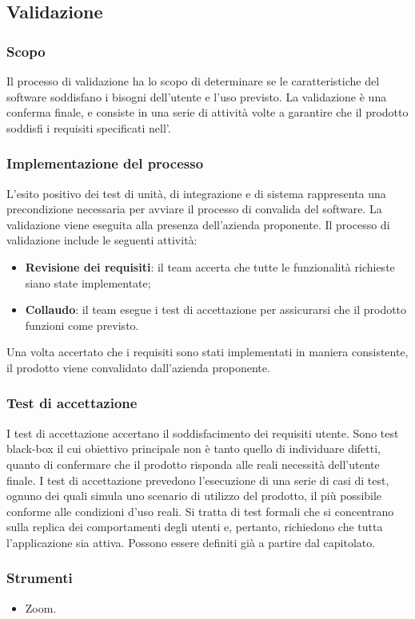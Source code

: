 \subsection{Validazione}\label{validazione}

\subsubsection{Scopo}
\par Il processo di validazione ha lo scopo di determinare se le caratteristiche del software soddisfano i bisogni dell'utente e l’uso previsto. La validazione è una conferma finale, e consiste in una serie di attività volte a garantire che il prodotto soddisfi i requisiti specificati nell’\AnalisiDeiRequisiti.

\subsubsection{Implementazione del processo}
\par L’esito positivo dei test di unità, di integrazione e di sistema rappresenta una precondizione necessaria per avviare il processo di convalida del software. La validazione viene eseguita alla presenza dell'azienda proponente. Il processo di validazione include le seguenti attività:
\begin{itemize}
  \item \textbf{Revisione dei requisiti}: il team accerta che tutte le funzionalità richieste siano state implementate;
  \item \textbf{Collaudo}: il team esegue i test di accettazione per assicurarsi che il prodotto funzioni come previsto.
\end{itemize}

\vspace{0.5\baselineskip}
\par Una volta accertato che i requisiti sono stati implementati in maniera consistente, il prodotto viene convalidato dall’azienda proponente.

\subsubsection{Test di accettazione}
\par I test di accettazione accertano il soddisfacimento dei requisiti utente. Sono test black-box il cui obiettivo principale non è tanto quello di individuare difetti, quanto di confermare che il prodotto risponda alle reali necessità dell’utente finale. I test di accettazione prevedono l’esecuzione di una serie di casi di test, ognuno dei quali simula uno scenario di utilizzo del prodotto, il più possibile conforme alle condizioni d’uso reali. Si tratta di test formali che si concentrano sulla replica dei comportamenti degli utenti e, pertanto, richiedono che tutta l'applicazione sia attiva. Possono essere definiti già a partire dal capitolato.

\subsubsection{Strumenti}
\IntroStrumenti
\begin{itemize}
  \item Zoom.
\end{itemize}